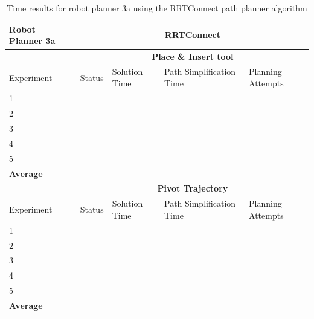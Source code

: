 \begin{table}[H]
\centering
\begin{tabular}{|p{2cm}|c|p{3cm}|p{3cm}|p{3cm}|}
\hline
Robot Planner 3a           & \multicolumn{4}{c}{\textbf{RRTConnect}}                                                                                                 \vline \\
\hline
                          & \multicolumn{4}{c}{\textbf{Place \& Insert tool}}                     \vline \\
\hline
Experiment                & Status & Solution Time & Path Simplification Time & Planning Attempts  \\
\hline
1                         &        &               &                          &  \\
2                         &        &               &                          &  \\
3                         &        &               &                          &  \\
4                         &        &               &                          &  \\
5                         &        &               &                          &  \\
\hline
\textbf{Average} & 	& 	& 	&  \\
\hline
                          & \multicolumn{4}{c}{\textbf{Pivot Trajectory}}                     \vline \\
\hline
Experiment                & Status & Solution Time & Path Simplification Time & Planning Attempts  \\
\hline
1                         &        &               &                          &  \\
2                         &        &               &                          &  \\
3                         &        &               &                          &  \\
4                         &        &               &                          &  \\
5                         &        &               &                          &  \\
\hline
\textbf{Average} & 	& 	& 	&  \\
\hline
\end{tabular}
\caption{Time results for robot planner 3a using the RRTConnect path planner algorithm}
\label{robot-planner3a-rrtconnect-data}
\end{table}


